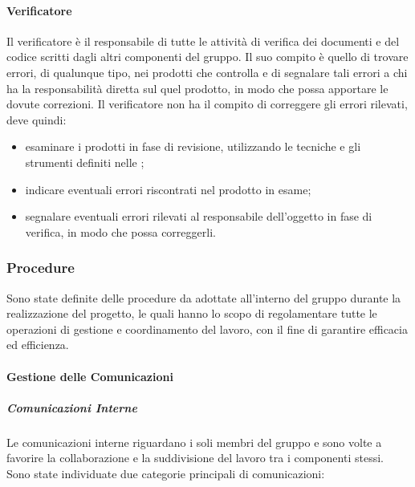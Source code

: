 		\paragraph{Verificatore}
		
			Il verificatore è il responsabile di tutte le attività di verifica dei documenti e del codice scritti dagli altri componenti del gruppo. Il suo compito è quello di trovare errori, di qualunque tipo, nei prodotti che controlla e di segnalare tali errori a chi ha la responsabilità diretta sul quel prodotto, in modo che possa apportare le dovute correzioni.
			\newline
			Il verificatore non ha il compito di correggere gli errori rilevati, deve quindi:
			
			\begin{itemize}
				\item esaminare i prodotti in fase di revisione, utilizzando le tecniche e gli strumenti definiti nelle ;
				\item indicare eventuali errori riscontrati nel prodotto in esame;
				\item segnalare eventuali errori rilevati al responsabile dell'oggetto in fase di verifica, in modo che possa correggerli.
			\end{itemize}	
	
	\subsubsection{Procedure}
		
		Sono state definite delle procedure da adottate all'interno del gruppo durante la realizzazione del progetto, le quali hanno lo scopo di regolamentare tutte le operazioni di gestione e coordinamento del lavoro, con il fine di garantire efficacia ed efficienza.
		
		\paragraph{Gestione delle Comunicazioni}
		
			\subparagraph{Comunicazioni Interne}
			
				Le comunicazioni interne riguardano i soli membri del gruppo e sono volte a favorire la collaborazione e la suddivisione del lavoro tra i componenti stessi.
				\newline
				Sono state individuate due categorie principali di comunicazioni:
				
